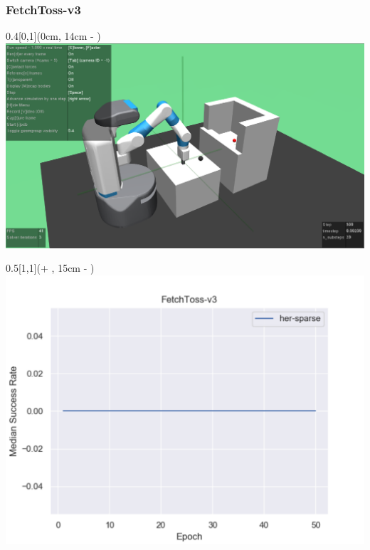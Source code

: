 


\begin{frame}
	\frametitle{FetchToss-v3}	
	\vspace{1cm}
	
	\begin{textblock*}{0.4\paperwidth}[0,1](0cm, 14cm - \PraesentationSeitenrand)%
		\includegraphics[width=0.4\paperwidth]{./Ressourcen/Figures/FetchToss-v3.pdf}
	\end{textblock*}
	
	\begin{textblock*}{0.5\paperwidth}[1,1](\textwidth + \PraesentationSeitenrand, 15cm - \PraesentationSeitenrand)%
		\includegraphics[width=0.5\paperwidth]{./Ressourcen/Figures/fig_FetchToss-v3.pdf}
	\end{textblock*}
	
\end{frame}
\clearpage


